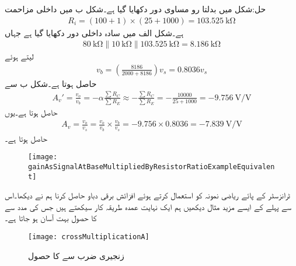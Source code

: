 حل:شکل  میں بدلتا رو مساوی دور دکھایا گیا ہے۔شکل  ب میں داخلی مزاحمت
\begin{align*}
R_i =\left(100+1 \right) \times \left(25+1000 \right) = \SI{103.525}{\kilo \ohm}
\end{align*}
ہے۔شکل  الف   میں سادہ داخلی دور دکھایا گیا ہے  جہاں
\begin{align*}
\SI{80}{\kilo \ohm} \mathbin{\|} \SI{10}{\kilo \ohm} \mathbin{\|} \SI{103.525}{\kilo \ohm}=\SI{8.186}{\kilo \ohm}
\end{align*}
لیتے ہوئے
\begin{align*}
v_b=\left(\frac{8186}{2000+8186}\right) v_s=0.8036 v_s
\end{align*}
حاصل ہوتا ہے۔شکل  ب سے
\begin{align*}
A_v'=\frac{v_o}{v_b}=-\alpha\frac{\sum R_C}{\sum R_E}\approx -\frac{\sum R_C}{\sum R_E}=-\frac{10000}{25+1000}=\SI{-9.756}{\volt \per \volt}
\end{align*} 
حاصل ہوتا ہے۔یوں
\begin{align*}
A_v=\frac{v_o}{v_s}=\frac{v_o}{v_b} \times \frac{v_b}{v_s}=-9.756 \times 0.8036=\SI{-7.839}{\volt \per \volt}
\end{align*}
حاصل ہوتا ہے۔
\begin{figure}
\centering
\texttt{[image: gainAsSignalAtBaseMultipliedByResistorRatioExampleEquivalent]}
\caption{}
\label{شکل_ٹرانزسٹر_داخلی_مزاحمت_سے_افزائش_مساوی}
\end{figure}
ٹرانزسٹر کے پائے ریاضی نمونہ  کو استعمال کرتے ہوئے افزائش برقی دباو  حاصل کرنا ہم نے دیکھا۔اس سے پہلے کے ایسے مزید مثال دیکھیں ہم ایک نہایت عمدہ طریقہ کار سیکھتے ہیں جس کی مدد سے  کا حصول بہت آسان ہو جاتا ہے۔
\begin{figure}
\centering
\texttt{[image: crossMultiplicationA]}
\caption{زنجیری ضرب سے  کا حصول}
\label{شکل_زنجیری_ضرب_الف}
\end{figure}

